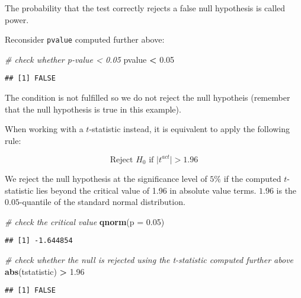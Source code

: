 \documentclass[]{book}
\newenvironment{Shaded}{\begin{snugshade}}{\end{snugshade}}
\newcommand{\KeywordTok}[1]{\textcolor[rgb]{0.13,0.29,0.53}{\textbf{#1}}}
\newcommand{\DataTypeTok}[1]{\textcolor[rgb]{0.13,0.29,0.53}{#1}}
\newcommand{\FloatTok}[1]{\textcolor[rgb]{0.00,0.00,0.81}{#1}}
\newcommand{\StringTok}[1]{\textcolor[rgb]{0.31,0.60,0.02}{#1}}
\newcommand{\CommentTok}[1]{\textcolor[rgb]{0.56,0.35,0.01}{\textit{#1}}}
\newcommand{\OperatorTok}[1]{\textcolor[rgb]{0.81,0.36,0.00}{\textbf{#1}}}
\newcommand{\NormalTok}[1]{#1}
\theoremstyle{definition}
\theoremstyle{definition}
\theoremstyle{definition}
\theoremstyle{remark}
\begin{document}
The probability that the test correctly rejects a false null hypothesis
is called power.

Reconsider \texttt{pvalue} computed further above:

\begin{Shaded}
\begin{Highlighting}[]
\CommentTok{# check whether p-value < 0.05}
\NormalTok{pvalue }\OperatorTok{<}\StringTok{ }\FloatTok{0.05}
\end{Highlighting}
\end{Shaded}

\begin{verbatim}
## [1] FALSE
\end{verbatim}

The condition is not fulfilled so we do not reject the null hypotheis
(remember that the null hypothesis is true in this example).

When working with a \(t\)-statistic instead, it is equivalent to apply
the following rule:

\[ \text{Reject } H_0 \text{ if } \lvert t^{act} \rvert > 1.96 \]

We reject the null hypothesis at the significance level of \(5\%\) if
the computed \(t\)-statistic lies beyond the critical value of 1.96 in
absolute value terms. \(1.96\) is the \(0.05\)-quantile of the standard
normal distribution.

\begin{Shaded}
\begin{Highlighting}[]
\CommentTok{# check the critical value}
\KeywordTok{qnorm}\NormalTok{(}\DataTypeTok{p =} \FloatTok{0.05}\NormalTok{)}
\end{Highlighting}
\end{Shaded}

\begin{verbatim}
## [1] -1.644854
\end{verbatim}

\begin{Shaded}
\begin{Highlighting}[]
\CommentTok{# check whether the null is rejected using the t-statistic computed further above}
\KeywordTok{abs}\NormalTok{(tstatistic) }\OperatorTok{>}\StringTok{ }\FloatTok{1.96}
\end{Highlighting}
\end{Shaded}

\begin{verbatim}
## [1] FALSE
\end{verbatim}
\end{document}
